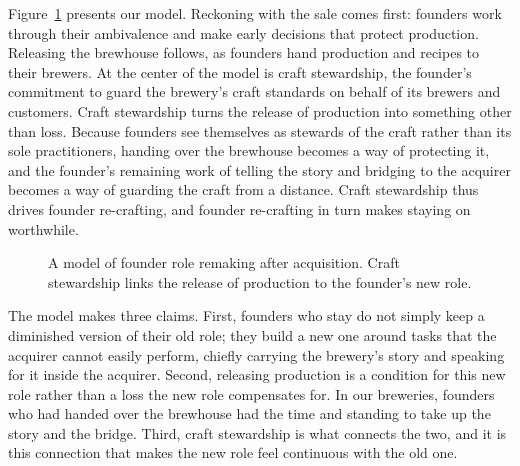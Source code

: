 \documentclass[12pt]{article}
\begin{document}
Figure~\ref{fig:model} presents our model. Reckoning with the sale comes first: founders work through their ambivalence and make early decisions that protect production. Releasing the brewhouse follows, as founders hand production and recipes to their brewers. At the center of the model is craft stewardship, the founder's commitment to guard the brewery's craft standards on behalf of its brewers and customers. Craft stewardship turns the release of production into something other than loss. Because founders see themselves as stewards of the craft rather than its sole practitioners, handing over the brewhouse becomes a way of protecting it, and the founder's remaining work of telling the story and bridging to the acquirer becomes a way of guarding the craft from a distance. Craft stewardship thus drives founder re-crafting, and founder re-crafting in turn makes staying on worthwhile.

\begin{figure}[htbp]
\centering
{}
\caption{A model of founder role remaking after acquisition. Craft stewardship links the release of production to the founder's new role.}
\label{fig:model}
\end{figure}

The model makes three claims. First, founders who stay do not simply keep a diminished version of their old role; they build a new one around tasks that the acquirer cannot easily perform, chiefly carrying the brewery's story and speaking for it inside the acquirer. Second, releasing production is a condition for this new role rather than a loss the new role compensates for. In our breweries, founders who had handed over the brewhouse had the time and standing to take up the story and the bridge. Third, craft stewardship is what connects the two, and it is this connection that makes the new role feel continuous with the old one.
\end{document}
